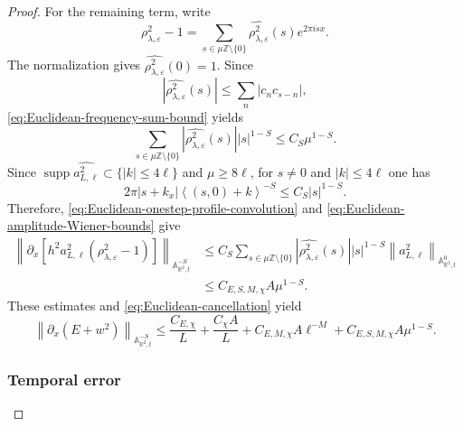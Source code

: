 \documentclass[10pt,a4paper]{amsart}
\newcommand{\A}{\mathbb A}
\newcommand{\R}{\mathbb R}
\newcommand{\Z}{\mathbb Z}
\newcommand{\abs}[1]{\left\lvert #1\right\rvert}
\newcommand{\eps}{\varepsilon}
\newcommand{\la}{\lambda}
\newcommand{\norm}[1]{\left\lVert #1\right\rVert}
\newcommand{\supp}{\operatorname{supp}}
\begin{document}
\begin{proof}
For the remaining term, write
\[
 \rho_{\la,\eps}^2-1
 =\sum_{s\in\mu\Z\setminus\{0\}}
 \widehat{\rho_{\la,\eps}^2}(s)e^{2\pi isx}.
\]
The normalization gives $\widehat{\rho_{\la,\eps}^2}(0)=1$.  Since
\[
 \abs{\widehat{\rho_{\la,\eps}^2}(s)}
 \leq\sum_n\abs{c_nc_{s-n}},
\]
\eqref{eq:Euclidean-frequency-sum-bound} yields
\begin{equation}\label{eq:Euclidean-onestep-profile-convolution}
 \sum_{s\in\mu\Z\setminus\{0\}}
 \abs{\widehat{\rho_{\la,\eps}^2}(s)}\abs s^{1-S}
 \leq C_S\mu^{1-S}.
\end{equation}
Since $\supp\widehat{a_{L,\ell}^2}\subset\{\abs k\leq4\ell\}$ and
$\mu\geq8\ell$, for $s\neq0$ and $\abs k\leq4\ell$ one has
\[
 2\pi\abs{s+k_x}\left\langle(s,0)+k\right\rangle^{-S}
 \leq C_S\abs s^{1-S}.
\]
Therefore, \eqref{eq:Euclidean-onestep-profile-convolution} and
\eqref{eq:Euclidean-amplitude-Wiener-bounds} give
\begin{align*}
 \norm{\partial_x\left[
 h^2a_{L,\ell}^2(\rho_{\la,\eps}^2-1)\right]}
 _{\A^{-S}_{\R^2,t}}
 &\leq C_S\sum_{s\in\mu\Z\setminus\{0\}}
 \abs{\widehat{\rho_{\la,\eps}^2}(s)}\abs s^{1-S}
 \norm{a_{L,\ell}^2}_{\A^0_{\R^2,t}}\\
 &\leq C_{E,S,M,\chi}A\mu^{1-S}.
\end{align*}
These estimates and \eqref{eq:Euclidean-cancellation} yield
\begin{equation}\label{eq:Euclidean-onestep-oscillation}
 \norm{\partial_x(E+w^2)}_{\A^{-S}_{\R^2,t}}
 \leq\frac{C_{E,\chi}}{L}+\frac{C_\chi A}{L}
 +C_{E,M,\chi}A\ell^{-M}+C_{E,S,M,\chi}A\mu^{1-S}.
\end{equation}

\subsubsection*{Temporal error}


\end{proof}
\end{document}
